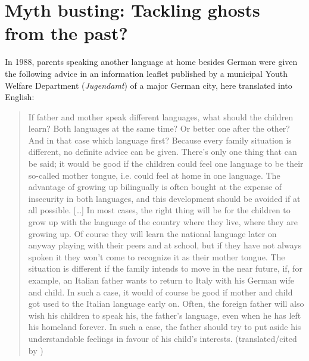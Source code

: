 \documentclass[output=paper,colorlinks,citecolor=brown]{langscibook}
\begin{document}
\section{Myth busting: Tackling ghosts from the past?} \label{sec:purkathoferetal:2}

In 1988, parents speaking another language at home besides German were given the following advice in an information leaflet published by a municipal Youth Welfare Department (\textit{Jugendamt}) of a major German city, here translated into English:

\begin{quote}
If father and mother speak different languages, what should the children learn? Both languages at the same time? Or better one after the other? And in that case which language first? Because every family situation is different, no definite advice can be given. There's only one thing that can be said; it would be good if the children could feel one language to be their so-called mother tongue, i.e. could feel at home in one language. The advantage of growing up bilingually is often bought at the expense of insecurity in both languages, and this development should be avoided if at all possible. […] In most cases, the right thing will be for the children to grow up with the language of the country where they live, where they are growing up. Of course they will learn the national language later on anyway playing with their peers and at school, but if they have not always spoken it they won't come to recognize it as their mother tongue. The situation is different if the family intends to move in the near future, if, for example, an Italian father wants to return to Italy with his German wife and child. In such a case, it would of course be good if mother and child got used to the Italian language early on. Often, the foreign father will also wish his children to speak his, the father's language, even when he has left his homeland forever. In such a case, the father should try to put aside his understandable feelings in favour of his child's interests. (translated/cited by \cite{Saunders1988})
\end{quote}
\end{document}
